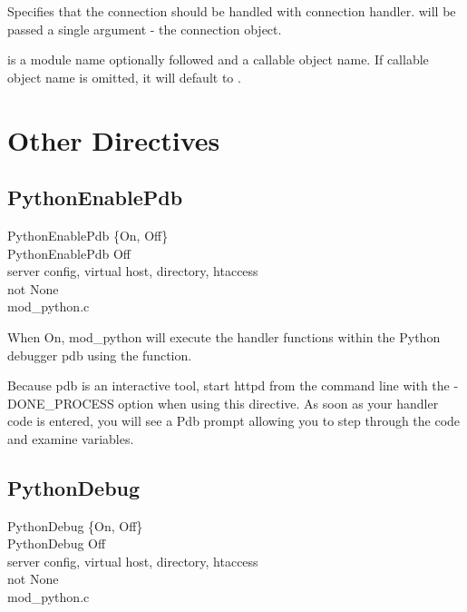 Specifies that the connection should be handled with 
connection handler.  will be passed a single argument -
the connection object.

 is a module name optionally followed \code{::} and a
callable object name. If callable object name is omitted, it will
default to .

\section{Other Directives\label{dir-other}}

\subsection{PythonEnablePdb\label{dir-other-epd}}

PythonEnablePdb \{On, Off\} \\
PythonEnablePdb Off\\
server config, virtual host, directory, htaccess\\
not None\\
mod_python.c

When On, mod_python will execute the handler functions within the
Python debugger pdb using the  function.

Because pdb is an interactive tool, start httpd from the command line
with the -DONE_PROCESS option when using this directive. As soon as
your handler code is entered, you will see a Pdb prompt allowing you
to step through the code and examine variables.

\subsection{PythonDebug\label{dir-other-pd}}

PythonDebug \{On, Off\} \\
PythonDebug Off\\
server config, virtual host, directory, htaccess\\
not None\\
mod_python.c

